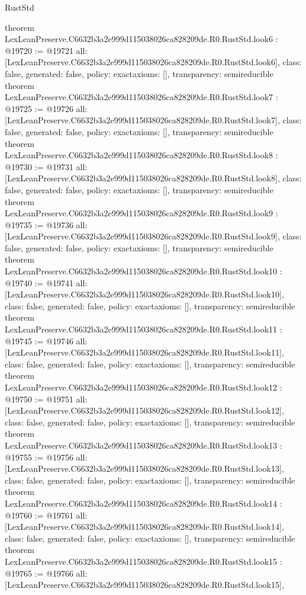 \begin{lexlean}{RustStd}
\begin{coremodule}
{}
theorem LexLeanPreserve.C6632b3a2e999d115038026ca828209de.R0.RustStd.look6 : @19720 := @19721 {
  all: [LexLeanPreserve.C6632b3a2e999d115038026ca828209de.R0.RustStd.look6],
  class: false,
  generated: false,
  policy: exact{axioms: []},
  transparency: semireducible
}
theorem LexLeanPreserve.C6632b3a2e999d115038026ca828209de.R0.RustStd.look7 : @19725 := @19726 {
  all: [LexLeanPreserve.C6632b3a2e999d115038026ca828209de.R0.RustStd.look7],
  class: false,
  generated: false,
  policy: exact{axioms: []},
  transparency: semireducible
}
theorem LexLeanPreserve.C6632b3a2e999d115038026ca828209de.R0.RustStd.look8 : @19730 := @19731 {
  all: [LexLeanPreserve.C6632b3a2e999d115038026ca828209de.R0.RustStd.look8],
  class: false,
  generated: false,
  policy: exact{axioms: []},
  transparency: semireducible
}
theorem LexLeanPreserve.C6632b3a2e999d115038026ca828209de.R0.RustStd.look9 : @19735 := @19736 {
  all: [LexLeanPreserve.C6632b3a2e999d115038026ca828209de.R0.RustStd.look9],
  class: false,
  generated: false,
  policy: exact{axioms: []},
  transparency: semireducible
}
theorem LexLeanPreserve.C6632b3a2e999d115038026ca828209de.R0.RustStd.look10 : @19740 := @19741 {
  all: [LexLeanPreserve.C6632b3a2e999d115038026ca828209de.R0.RustStd.look10],
  class: false,
  generated: false,
  policy: exact{axioms: []},
  transparency: semireducible
}
theorem LexLeanPreserve.C6632b3a2e999d115038026ca828209de.R0.RustStd.look11 : @19745 := @19746 {
  all: [LexLeanPreserve.C6632b3a2e999d115038026ca828209de.R0.RustStd.look11],
  class: false,
  generated: false,
  policy: exact{axioms: []},
  transparency: semireducible
}
theorem LexLeanPreserve.C6632b3a2e999d115038026ca828209de.R0.RustStd.look12 : @19750 := @19751 {
  all: [LexLeanPreserve.C6632b3a2e999d115038026ca828209de.R0.RustStd.look12],
  class: false,
  generated: false,
  policy: exact{axioms: []},
  transparency: semireducible
}
theorem LexLeanPreserve.C6632b3a2e999d115038026ca828209de.R0.RustStd.look13 : @19755 := @19756 {
  all: [LexLeanPreserve.C6632b3a2e999d115038026ca828209de.R0.RustStd.look13],
  class: false,
  generated: false,
  policy: exact{axioms: []},
  transparency: semireducible
}
theorem LexLeanPreserve.C6632b3a2e999d115038026ca828209de.R0.RustStd.look14 : @19760 := @19761 {
  all: [LexLeanPreserve.C6632b3a2e999d115038026ca828209de.R0.RustStd.look14],
  class: false,
  generated: false,
  policy: exact{axioms: []},
  transparency: semireducible
}
theorem LexLeanPreserve.C6632b3a2e999d115038026ca828209de.R0.RustStd.look15 : @19765 := @19766 {
  all: [LexLeanPreserve.C6632b3a2e999d115038026ca828209de.R0.RustStd.look15],
}
\end{coremodule}
\end{lexlean}
